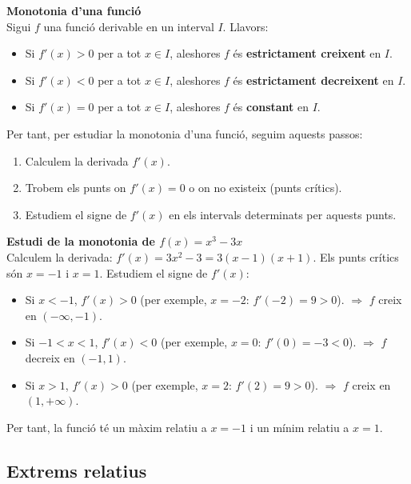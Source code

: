 \documentclass[12pt]{article}
\begin{document}
\begin{concept}
\textbf{Monotonia d'una funció}\\
Sigui $f$ una funció derivable en un interval $I$. Llavors:
\begin{itemize}
    \item Si $f'(x) > 0$ per a tot $x \in I$, aleshores $f$ és \textbf{estrictament creixent} en $I$.
    \item Si $f'(x) < 0$ per a tot $x \in I$, aleshores $f$ és \textbf{estrictament decreixent} en $I$.
    \item Si $f'(x) = 0$ per a tot $x \in I$, aleshores $f$ és \textbf{constant} en $I$.
\end{itemize}

Per tant, per estudiar la monotonia d'una funció, seguim aquests passos:
\begin{enumerate}
    \item Calculem la derivada $f'(x)$.
    \item Trobem els punts on $f'(x)=0$ o on no existeix (punts crítics).
    \item Estudiem el signe de $f'(x)$ en els intervals determinats per aquests punts.
\end{enumerate}
\end{concept}

\begin{exemple}
\textbf{Estudi de la monotonia de $f(x)=x^3-3x$}\\
Calculem la derivada: $f'(x)=3x^2-3=3(x-1)(x+1)$.
Els punts crítics són $x=-1$ i $x=1$.
Estudiem el signe de $f'(x)$:
\begin{itemize}
    \item Si $x<-1$, $f'(x)>0$ (per exemple, $x=-2$: $f'(-2)=9>0$). $\Rightarrow$ $f$ creix en $(-\infty,-1)$.
    \item Si $-1<x<1$, $f'(x)<0$ (per exemple, $x=0$: $f'(0)=-3<0$). $\Rightarrow$ $f$ decreix en $(-1,1)$.
    \item Si $x>1$, $f'(x)>0$ (per exemple, $x=2$: $f'(2)=9>0$). $\Rightarrow$ $f$ creix en $(1,+\infty)$.
\end{itemize}
Per tant, la funció té un màxim relatiu a $x=-1$ i un mínim relatiu a $x=1$.
\end{exemple}

\subsection{Extrems relatius}
\end{document}
